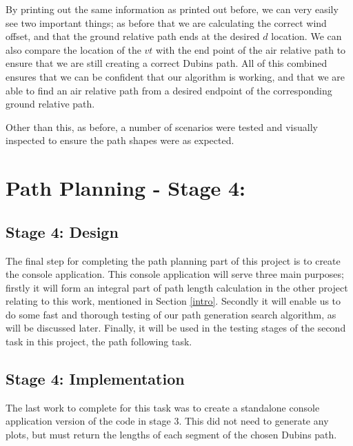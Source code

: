 By printing out the same information as printed out before, we can very easily see two important things; as before that we are calculating the correct wind offset, and that the ground relative path ends at the desired $d$ location. We can also compare the location of the $vt$ with the end point of the air relative path to ensure that we are still creating a correct Dubins path. All of this combined ensures that we can be confident that our algorithm is working, and that we are able to find an air relative path from a desired endpoint of the corresponding ground relative path. 

Other than this, as before, a number of scenarios were tested and visually inspected to ensure the path shapes were as expected.

\section{Path Planning - Stage 4: }
\label{task1:stage4}

\subsection{Stage 4: Design}
\label{task1:stage4:design}

The final step for completing the path planning part of this project is to create the console application. This console application will serve three main purposes; firstly it will form an integral part of path length calculation in the other project relating to this work, mentioned in Section \ref{intro}. Secondly it will enable us to do some fast and thorough testing of our path generation search algorithm, as will be discussed later. Finally, it will be used in the testing stages of the second task in this project, the path following task.

\subsection{Stage 4: Implementation}
\label{task1:stage4:implementation}

The last work to complete for this task was to create a standalone console application version of the code in stage 3. This did not need to generate any plots, but must return the lengths of each segment of the chosen Dubins path. 

